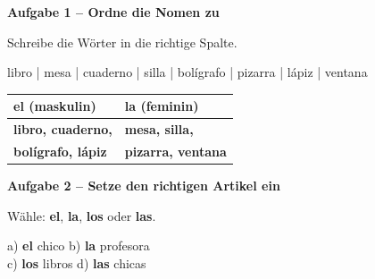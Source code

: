 \documentclass[11pt, a4paper]{article}
\newcommand{\fachfarbe}{spanisch}
\newcommand{\punktebox}[1]{\hfill\fbox{\small \_/#1}}
\newcommand{\lsg}[1]{\textcolor{loesung}{\textbf{#1}}}
\newenvironment{aufgabe}[1]{%
    \needspace{5\baselineskip}%
    \nopagebreak[4]%
    \vspace{10pt}
    \noindent\textbf{\textcolor{\fachfarbe}{Aufgabe #1}}
    \nopagebreak[4]%
    \vspace{5pt}
    \nopagebreak[4]%
    \begin{list}{}{\leftmargin=0pt}
    \item[]
}{%
    \end{list}
}
\newcommand{\es}[1]{\textcolor{\fachfarbe}{\textbf{#1}}}
\begin{document}
\vspace{10pt}


\begin{aufgabe}{1 -- Ordne die Nomen zu}
Schreibe die Wörter in die richtige Spalte. \punktebox{4}
\end{aufgabe}

\begin{vokabelkasten}
libro | mesa | cuaderno | silla | bolígrafo | pizarra | lápiz | ventana
\end{vokabelkasten}

\vspace{0.5em}

\begin{center}
\begin{tabular}{|p{6cm}|p{6cm}|}
\hline
\textbf{\es{el} (maskulin)} & \textbf{\es{la} (feminin)} \\
\hline
\lsg{libro, cuaderno,} & \lsg{mesa, silla,} \\
\lsg{bolígrafo, lápiz} & \lsg{pizarra, ventana} \\[1em]
\hline
\end{tabular}
\end{center}

\vspace{10pt}


\begin{aufgabe}{2 -- Setze den richtigen Artikel ein}
Wähle: \es{el}, \es{la}, \es{los} oder \es{las}. \punktebox{4}
\end{aufgabe}

\noindent
a) \lsg{el} chico \hfill
b) \lsg{la} profesora \\[0.8em]
c) \lsg{los} libros \hfill
d) \lsg{las} chicas \\

\vspace{15pt}

\end{document}
